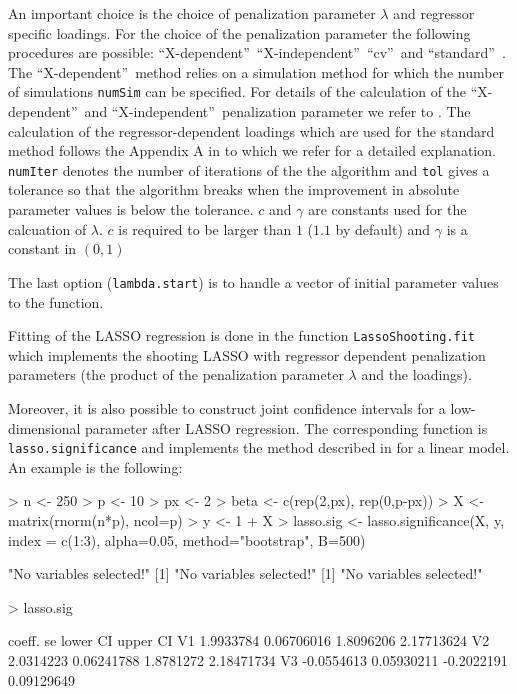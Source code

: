 \documentclass{amsart}
\begin{document}
An important choice is the choice of penalization parameter $\lambda$ and regressor specific loadings. For the choice of the penalization parameter the following procedures are possible: \textquotedblleft X-dependent\textquotedblright\, \textquotedblleft X-independent\textquotedblright\,  \textquotedblleft cv\textquotedblright\ and \textquotedblleft standard\textquotedblright\ . %
The \textquotedblleft X-dependent\textquotedblright\ method relies on a simulation method for which the number of simulations \texttt{numSim} can be specified. For details of the calculation of the \textquotedblleft X-dependent\textquotedblright\ and \textquotedblleft X-independent\textquotedblright\ penalization parameter we refer to \cite{BCH2011:InferenceGauss}. The calculation of the regressor-dependent loadings which are used for the standard method follows the Appendix A in \cite{BCCH12} to which we refer for a detailed explanation. \texttt{numIter} denotes the number of iterations of the the algorithm and \texttt{tol} gives a tolerance so that the algorithm breaks when the improvement in absolute parameter values is below the tolerance. $c$ and $\gamma$ are constants used for the calcuation of $\lambda$. $c$ is required to be larger than $1$ ($1.1$ by default) and $\gamma$ is a constant in $(0,1)$

The last option (\texttt{lambda.start}) is to handle a vector of initial parameter values to the function.

Fitting of the LASSO regression is done in the function \texttt{LassoShooting.fit} which implements the shooting LASSO \cite{Fu:1998} with regressor dependent penalization parameters (the product of the penalization parameter $\lambda$ and the loadings).

Moreover, it is also possible to construct joint confidence intervals for a low-dimensional parameter after LASSO regression. The corresponding function is \texttt{lasso.significance} and implements the method described in \cite{BCK-LAD} for a linear model. An example is the following:

\begin{Schunk}
\begin{Sinput}
> n <- 250
> p <- 10
> px <- 2
> beta <- c(rep(2,px), rep(0,p-px))
> X <- matrix(rnorm(n*p), ncol=p)
> y <- 1 + X %
> lasso.sig <- lasso.significance(X, y, index = c(1:3), alpha=0.05, method="bootstrap", B=500)
\end{Sinput}
\begin{Soutput}
[1] "No variables selected!"
[1] "No variables selected!"
[1] "No variables selected!"
\end{Soutput}
\begin{Sinput}
> lasso.sig
\end{Sinput}
\begin{Soutput}
       coeff.         se   lower CI   upper CI
V1  1.9933784 0.06706016  1.8096206 2.17713624
V2  2.0314223 0.06241788  1.8781272 2.18471734
V3 -0.0554613 0.05930211 -0.2022191 0.09129649
\end{Soutput}
\end{Schunk}
\end{document}
